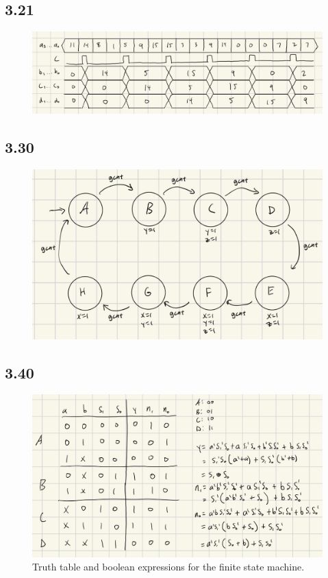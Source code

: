 \documentclass{article}
\begin{document}
\subsection*{3.21}
\begin{figure}[H]
    \centering
    \includegraphics[width=\textwidth]{./images/3_21.jpg}
\end{figure}

\subsection*{3.30}
\begin{figure}[H]
    \centering
    \includegraphics[width=\textwidth]{./images/3_30.jpg}
\end{figure}

\subsection*{3.40}
\begin{figure}[H]
    \centering
    \includegraphics[width=\textwidth]{./images/3_40.jpg}
    \caption*{Truth table and boolean expressions for the finite state machine.}
\end{figure}
\end{document}
